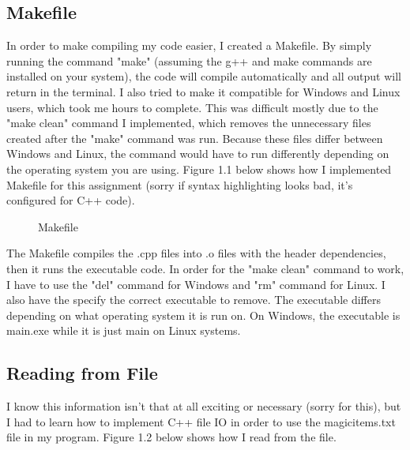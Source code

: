 \documentclass[letterpaper, 10pt]{article}
\begin{document}
\subsection{Makefile}
\noindent
In order to make compiling my code easier, I created a Makefile. By simply running the command "make" (assuming the g++ and make commands are installed on your system), the code will compile automatically and all output will return in the terminal. I also tried to make it compatible for Windows and Linux users, which took me hours to complete. This was difficult mostly due to the "make clean" command I implemented, which removes the unnecessary files created after the "make" command was run. Because these files differ between Windows and Linux, the command would have to run differently depending on the operating system you are using. Figure 1.1 below shows how I implemented Makefile for this assignment (sorry if syntax highlighting looks bad, it's configured for C++ code).

\begin{figure}[H]
  \centering
  \label{fig:figure1.1_part1}
\end{figure}

\begin{figure}[H]
  \centering
  \caption{Makefile}
  \label{fig:figure1.1_part2}
\end{figure}
\noindent
The Makefile compiles the .cpp files into .o files with the header dependencies, then it runs the executable code. In order for the "make clean" command to work, I have to use the "del" command for Windows and "rm" command for Linux. I also have the specify the correct executable to remove. The executable differs depending on what operating system it is run on. On Windows, the executable is main.exe while it is just main on Linux systems. 

\subsection{Reading from File}
\noindent
I know this information isn't that at all exciting or necessary (sorry for this), but I had to learn how to implement C++ file IO in order to use the magicitems.txt file in my program. Figure 1.2 below shows how I read from the file. 
\begin{figure}[H]
  \centering
   
  \label{fig:figure1.2_part1}
\end{figure}
\end{document}
